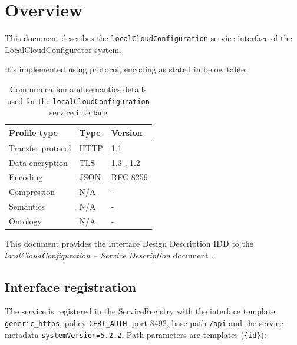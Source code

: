 \documentclass[a4paper]{arrowhead}
\begin{document}
\section{Overview}
\label{sec:overview}

This document describes the \texttt{local\allowbreak{}Cloud\allowbreak{}Configuration} service interface of the LocalCloudConfigurator system.

It's implemented using protocol, encoding as stated in below table:
\begin{table}[ht!]
  \centering
  \begin{tabular}{|l|l|l|}
    \hline
    \rowcolor{gray!33} Profile type & Type & Version \\ \hline
    Transfer protocol & HTTP & 1.1 \cite{rfc9112} \\ \hline
    Data encryption & TLS & 1.3 \cite{rfc8446}, 1.2 \cite{rfc5246} \\ \hline
    Encoding & JSON & RFC 8259 \cite{rfc8259} \\ \hline
    Compression & N/A & - \\ \hline
    Semantics & N/A & - \\ \hline
    Ontology & N/A & - \\ \hline
  \end{tabular}
  \caption{Communication and semantics details used for the \texttt{local\allowbreak{}Cloud\allowbreak{}Configuration} service interface}
  \label{tab:comunication_semantics_profile}
\end{table}

This document provides the Interface Design Description IDD to the \textit{localCloudConfiguration -- Service Description} document \cite{lcc-localCloudConfiguration-sd}.

\subsection{Interface registration}

The service is registered in the ServiceRegistry with the interface template \texttt{generic\_\allowbreak{}https}, policy \texttt{CERT\_\allowbreak{}AUTH}, port 8492, base path \texttt{/\allowbreak{}api} and the service metadata \texttt{systemVersion=5.2.2}. Path parameters are templates (\texttt{\{id\}}):
\end{document}
